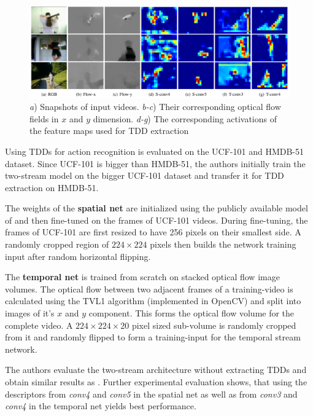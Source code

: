 \begin{figure}[H]
    \centering
    \includegraphics[width=\textwidth]{img_deep/tdd_featuremaps}
    \caption{\textit{a}) Snapshots of input videos. \textit{b-c}) Their corresponding optical flow fields in $x$ and $y$ dimension. \textit{d-g}) The corresponding activations of the feature maps used for TDD extraction \cite{wang_action_2015}}
    \label{fig:tdd_featuremaps}
\end{figure}

Using TDDs for action recognition is evaluated on the UCF-101 and HMDB-51 dataset.
Since UCF-101 is bigger than HMDB-51, the authors initially train the two-stream model on the bigger UCF-101 dataset and transfer it for TDD extraction on HMDB-51.

The weights of the \textbf{spatial net} are initialized using the publicly available model of \cite{chatfield_return_2014} and then fine-tuned on the frames of UCF-101 videos.
During fine-tuning, the frames of UCF-101 are first resized to have 256 pixels on their smallest side.
A randomly cropped region of $224 \times 224$ pixels then builds the network training input after random horizontal flipping.

The \textbf{temporal net} is trained from scratch on stacked optical flow image volumes.
The optical flow between two adjacent frames of a training-video is calculated using the TVL1 algorithm \cite{zach_duality_2007} (implemented in OpenCV) and split into images of it's $x$ and $y$ component.
This forms the optical flow volume for the complete video.
A $224 \times 224 \times 20$ pixel sized sub-volume is randomly cropped from it and randomly flipped to form a training-input for the temporal stream network.

The authors evaluate the two-stream architecture without extracting TDDs and obtain similar results as \textcite{simonyan_two-stream_2014}.
Further experimental evaluation shows, that using the descriptors from \textit{conv4} and \textit{conv5} in the spatial net as well as from \textit{conv3} and \textit{conv4} in the temporal net yields best performance.

